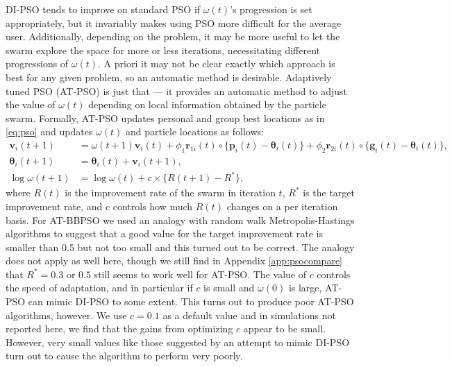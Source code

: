 \documentclass[12pt]{article}
\begin{document}
DI-PSO tends to improve on standard PSO if $\omega(t)$'s progression is set appropriately, but it invariably makes using PSO more difficult for the average user. Additionally, depending on the problem, it may be more useful to let the swarm explore the space for more or less iterations, necessitating different progressions of $\omega(t)$. A priori it may not be clear exactly which approach is best for any given problem, so an automatic method is desirable. Adaptively tuned PSO (AT-PSO) is just that --- it provides an automatic method to adjust the value of $\omega(t)$ depending on local information obtained by the particle swarm. Formally, AT-PSO updates personal and group best locations as in \eqref{eq:pso} and updates $\omega(t)$ and particle locations as follows:
\begin{align}\label{eq:atpso}
\bm{v}_i(t+1) &= \omega(t+1) \bm{v}_i(t) + \phi_1 \bm{r}_{1i}(t)\circ\{\bm{p}_i(t) - \bm{\theta}_i(t)\} + \phi_2 \bm{r}_{2i}(t)\circ\{\bm{g}_i(t) - \bm{\theta}_i(t)\},\nonumber\\
\bm{\theta}_i(t+1) &= \bm{\theta}_i(t) + \bm{v}_i(t+1),\nonumber\\
\log\omega(t+1)& = \log\omega(t) + c\times\{R(t+1) - R^*\},
\end{align}
where $R(t)$ is the improvement rate of the swarm in iteration $t$, $R^*$ is the target improvement rate, and $c$ controls how much $R(t)$ changes on a per iteration basis. For AT-BBPSO we used an analogy with random walk Metropolis-Hastings algorithms to suggest that a good value for the target improvement rate is smaller than 0.5 but not too small and this turned out to be correct. The analogy does not apply as well here, though we still find in Appendix \ref{app:psocompare} that $R^*=0.3$ or $0.5$ still seems to work well for AT-PSO. The value of $c$ controls the speed of adaptation, and in particular if $c$ is small and $\omega(0)$ is large, AT-PSO can mimic DI-PSO to some extent. This turns out to produce poor AT-PSO algorithms, however. We use $c=0.1$ as a default value and in simulations not reported here, we find that the gains from optimizing $c$ appear to be small. However, very small values like those suggested by an attempt to mimic DI-PSO turn out to cause the algorithm to perform very poorly. 
\end{document}

